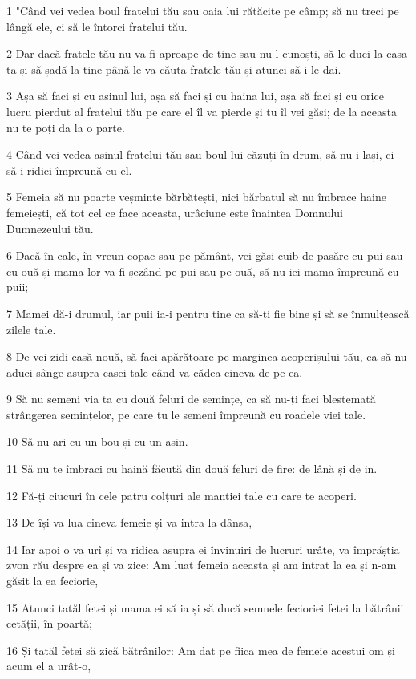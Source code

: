 \par 1 "Când vei vedea boul fratelui tău sau oaia lui rătăcite pe câmp; să nu treci pe lângă ele, ci să le întorci fratelui tău.
\par 2 Dar dacă fratele tău nu va fi aproape de tine sau nu-l cunoști, să le duci la casa ta și să șadă la tine până le va căuta fratele tău și atunci să i le dai.
\par 3 Așa să faci și cu asinul lui, așa să faci și cu haina lui, așa să faci și cu orice lucru pierdut al fratelui tău pe care el îl va pierde și tu îl vei găsi; de la aceasta nu te poți da la o parte.
\par 4 Când vei vedea asinul fratelui tău sau boul lui căzuți în drum, să nu-i lași, ci să-i ridici împreună cu el.
\par 5 Femeia să nu poarte veșminte bărbătești, nici bărbatul să nu îmbrace haine femeiești, că tot cel ce face aceasta, urâciune este înaintea Domnului Dumnezeului tău.
\par 6 Dacă în cale, în vreun copac sau pe pământ, vei găsi cuib de pasăre cu pui sau cu ouă și mama lor va fi șezând pe pui sau pe ouă, să nu iei mama împreună cu puii;
\par 7 Mamei dă-i drumul, iar puii ia-i pentru tine ca să-ți fie bine și să se înmulțească zilele tale.
\par 8 De vei zidi casă nouă, să faci apărătoare pe marginea acoperișului tău, ca să nu aduci sânge asupra casei tale când va cădea cineva de pe ea.
\par 9 Să nu semeni via ta cu două feluri de semințe, ca să nu-ți faci blestemată strângerea semințelor, pe care tu le semeni împreună cu roadele viei tale.
\par 10 Să nu ari cu un bou și cu un asin.
\par 11 Să nu te îmbraci cu haină făcută din două feluri de fire: de lână și de in.
\par 12 Fă-ți ciucuri în cele patru colțuri ale mantiei tale cu care te acoperi.
\par 13 De își va lua cineva femeie și va intra la dânsa,
\par 14 Iar apoi o va urî și va ridica asupra ei învinuiri de lucruri urâte, va împrăștia zvon rău despre ea și va zice: Am luat femeia aceasta și am intrat la ea și n-am găsit la ea feciorie,
\par 15 Atunci tatăl fetei și mama ei să ia și să ducă semnele fecioriei fetei la bătrânii cetății, în poartă;
\par 16 Și tatăl fetei să zică bătrânilor: Am dat pe fiica mea de femeie acestui om și acum el a urât-o,
